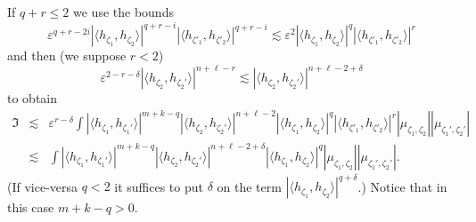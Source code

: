 \documentclass[a4paper,11pt]{article}
\begin{document}
If $q + r \leqslant 2$ we use the bounds
\[ \varepsilon^{q + r - 2 i} | \langle h_{\zeta_1}, h_{\zeta_2} \rangle |^{q +
   r - i} | \langle h_{\zeta'_1}, h_{\zeta'_2} \rangle |^{q + r - i} \lesssim
   \varepsilon^2 | \langle h_{\zeta_1}, h_{\zeta_2} \rangle |^q | \langle
   h_{\zeta'_1}, h_{\zeta'_2} \rangle |^r \]
and then (we suppose $r < 2$)
\[ \varepsilon^{2 - r - \delta} | \langle h_{\zeta_2}, h_{\zeta_2'} \rangle
   |^{n + \ell - r} \lesssim | \langle h_{\zeta_2}, h_{\zeta_2'} \rangle |^{n
   + \ell - 2 + \delta} \]
to obtain
\begin{eqnarray}
  \mathfrak{I} & \lesssim & \varepsilon^{r - \delta} \int | \langle
  h_{\zeta_1}, h_{\zeta_1'} \rangle |^{m + k - q} | \langle h_{\zeta_2},
  h_{\zeta_2'} \rangle |^{n + \ell - 2} | \langle h_{\zeta_1}, h_{\zeta_2}
  \rangle |^q | \langle h_{\zeta'_1}, h_{\zeta'_2} \rangle |^r | \mu_{\zeta_1,
  \zeta_2} | | \mu_{\zeta_1', \zeta_2'} | \nonumber\\
  & \lesssim & \int | \langle h_{\zeta_1}, h_{\zeta_1'} \rangle |^{m + k - q}
  | \langle h_{\zeta_2}, h_{\zeta_2'} \rangle |^{n + \ell - 2 + \delta} |
  \langle h_{\zeta_1}, h_{\zeta_2} \rangle |^q | \mu_{\zeta_1, \zeta_2} | |
  \mu_{\zeta_1', \zeta_2'} | .  \label{e:graph-est-1}
\end{eqnarray}
(If vice-versa $q < 2$ it suffices to put $\delta$ on the term $| \langle
h_{\zeta_1}, h_{\zeta_2} \rangle |^{q + \delta}$.) Notice that in this case $m
+ k - q > 0.$
\end{document}
